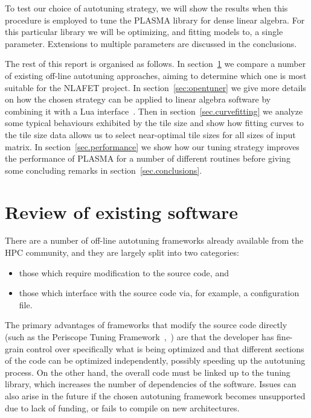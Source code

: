 \documentclass[a4paper,12pt]{article}
\begin{document}
To test our choice of autotuning strategy,
we will show the results when this procedure is employed to tune
the PLASMA library for dense linear algebra.
For this particular library we will be optimizing,
and fitting models to,
a single parameter.
Extensions to multiple parameters are discussed in the conclusions.

The rest of this report is organised as follows.
In section~\ref{sec.review} we compare a number of existing
off-line autotuning approaches,
aiming to determine which one is most suitable
for the NLAFET project.
In section~\ref{sec:opentuner} we give more details
on how the chosen strategy can be applied to linear algebra software
by combining it with a Lua interface~\cite{ierusalimschy2006lua}.
Then in section~\ref{sec.curvefitting} we analyze some typical
behaviours exhibited by the tile size and show how fitting curves
to the tile size data allows us to select near-optimal tile sizes
for all sizes of input matrix.
In section~\ref{sec.performance} we show how our
tuning strategy improves the performance of PLASMA for
a number of different routines before giving some concluding remarks in
section~\ref{sec.conclusions}.

\section{Review of existing software}
\label{sec.review}
There are a number of off-line autotuning frameworks already
available from the HPC community,
and they are largely split into two categories:
\begin{itemize}
\item those which require modification to the source code, and
\item those which interface with the source code via, for example,
  a configuration file.
\end{itemize}

The primary advantages of frameworks that modify the
source code directly
(such as the
Periscope Tuning Framework~\cite{mice13},~\cite{ptf14})
are that the developer has fine-grain control over specifically what
is being optimized and that different sections of the code can be
optimized independently,
possibly speeding up the autotuning process.
On the other hand,
the overall code must be linked up to the tuning library,
which increases the number of dependencies of the software.
Issues can also arise in the future if the chosen
autotuning framework becomes unsupported due to lack of funding,
or fails to compile on new architectures.
\end{document}
